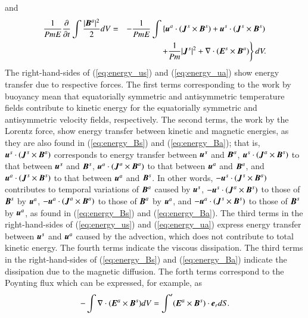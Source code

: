 %
and 
%
\begin{eqnarray}
\displaystyle
\frac{1}{Pm E}\frac{\partial}{\partial t}
 \int \frac{|\mbox{\boldmath$B$}^a|^2}{2} d V 
& = & \displaystyle
- \frac{1}{Pm E}\int \left\{
      \mbox{\boldmath$u$}^a \cdot 
          ( \mbox{\boldmath$J$}^s \times \mbox{\boldmath$B$}^s )
    + \mbox{\boldmath$u$}^s \cdot 
          ( \mbox{\boldmath$J$}^s \times \mbox{\boldmath$B$}^s )
    \right.
\nonumber \\
\hspace{3em}
 & & \displaystyle
    \left.
    + \frac{1}{Pm} |\mbox{\boldmath$J$}^s|^2
    + \nabla \cdot ( \mbox{\boldmath$E$}^s \times \mbox{\boldmath$B$}^a ) 
      \right\} d V.
\label{eq:energy_Ba}
\end{eqnarray}
%
The right-hand-sides of (\ref{eq:energy_us}) and (\ref{eq:energy_ua}) show energy transfer due to respective forces.
The first terms corresponding to the work by buoyancy mean that equatorially symmetric and antisymmetric temperature fields contribute to kinetic energy for the equatorially symmetric and antisymmetric velocity fields, respectively.
The second terms, the work by the Lorentz force, show energy transfer between kinetic and magnetic energies, as they are also found in (\ref{eq:energy_Bs}) and (\ref{eq:energy_Ba}); that is, $\mbox{\boldmath$u$}^s \cdot (\mbox{\boldmath$J$}^s \times \mbox{\boldmath$B$}^a)$ corresponds to energy transfer between $\mbox{\boldmath$u$}^s$ and $\mbox{\boldmath$B$}^a$, $\mbox{\boldmath$u$}^s \cdot (\mbox{\boldmath$J$}^a \times \mbox{\boldmath$B$}^s)$ to that between $\mbox{\boldmath$u$}^s$ and $\mbox{\boldmath$B$}^s$, $\mbox{\boldmath$u$}^a \cdot (\mbox{\boldmath$J$}^a \times \mbox{\boldmath$B$}^a)$ to that between $\mbox{\boldmath$u$}^a$ and $\mbox{\boldmath$B$}^a$, and $\mbox{\boldmath$u$}^a \cdot (\mbox{\boldmath$J$}^s \times \mbox{\boldmath$B$}^s)$ to that between $\mbox{\boldmath$u$}^a$ and $\mbox{\boldmath$B$}^s$.
In other words, $-\mbox{\boldmath$u$}^s \cdot (\mbox{\boldmath$J$}^s \times \mbox{\boldmath$B$}^a)$ contributes to temporal variations of $\mbox{\boldmath$B$}^a$ caused by $\mbox{\boldmath$u$}^s$, $-\mbox{\boldmath$u$}^s \cdot (\mbox{\boldmath$J$}^a \times \mbox{\boldmath$B$}^s)$ to those of $\mbox{\boldmath$B$}^s$ by $\mbox{\boldmath$u$}^a$, $-\mbox{\boldmath$u$}^a \cdot (\mbox{\boldmath$J$}^a \times \mbox{\boldmath$B$}^a)$ to those of $\mbox{\boldmath$B$}^a$ by $\mbox{\boldmath$u$}^a$, and $-\mbox{\boldmath$u$}^a \cdot (\mbox{\boldmath$J$}^s \times \mbox{\boldmath$B$}^s)$ to those of $\mbox{\boldmath$B$}^s$ by $\mbox{\boldmath$u$}^a$, as found in (\ref{eq:energy_Bs}) and (\ref{eq:energy_Ba}).
The third terms in the right-hand-sides of (\ref{eq:energy_us}) and (\ref{eq:energy_ua}) express energy transfer between $\mbox{\boldmath$u$}^s$ and $\mbox{\boldmath$u$}^a$ caused by the advection, which does not contribute to total kinetic energy.
The fourth terms indicate the {\color{red} viscous} dissipation. 
The third terms in the right-hand-sides of (\ref{eq:energy_Bs}) and (\ref{eq:energy_Ba}) indicate the dissipation due to the magnetic diffusion.
The forth terms correspond to the Poynting flux which can be expressed, for example, as
%
\begin{equation}
-\int \nabla \cdot
  ( \mbox{\boldmath$E$}^a \times \mbox{\boldmath$B$}^s ) d V =
 \int ' (\mbox{\boldmath$E$}^a \times \mbox{\boldmath$B$}^s )
   \cdot \mbox{\boldmath$e$}_r d S .
\label{eq:Poynting}
\end{equation}
%

